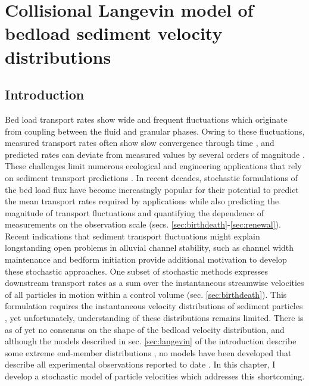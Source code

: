 
\chapter{Collisional Langevin model of bedload sediment velocity distributions}
\label{ch:langevin}
\section{Introduction}

Bed load transport rates show wide and frequent fluctuations which originate from coupling between the fluid and granular phases.
Owing to these fluctuations, measured transport rates often show slow convergence through time \citep{Dhont2018,Turowski2010}, and predicted rates can deviate from measured values by several orders of magnitude \citep{Recking2012,Martin2003}.
These challenges limit numerous ecological and engineering applications that rely on sediment transport predictions \citep{Gaeuman2017,Malmon2005}.
In recent decades, stochastic formulations of the bed load flux have become increasingly popular for their potential to predict the mean transport rates required by applications while also predicting the magnitude of transport fluctuations and quantifying the dependence of measurements on the observation scale (secs. \ref{sec:birthdeath}-\ref{sec:renewal}).
Recent indications that sediment transport fluctuations might explain longstanding open problems in alluvial channel stability, such as channel width maintenance \citep{Abramian2019,Abramian2020} and bedform initiation \citep{Jerolmack2005,Bohorquez2016} provide additional motivation to develop these stochastic approaches.
One subset of stochastic methods expresses downstream transport rates as a sum over the instantaneous streamwise velocities of all particles in motion within a control volume (sec. \ref{sec:birthdeath}).
This formulation requires the instantaneous velocity distributions of sediment particles \citep[e.g.][]{Ancey2020a}, yet unfortunately, understanding of these distributions remains limited.
There is as of yet no consensus on the shape of the bedload velocity distribution, and although the models described in sec. \ref{sec:langevin} of the introduction describe some extreme end-member distributions \citep[e.g.][]{Fan2014,Ancey2014}, no models have been developed that describe all experimental observations reported to date \citep{Lajeunesse2010,Fathel2015,Heyman2016,Liu2019,Houssais2012}.
In this chapter, I develop a stochastic model of particle velocities which addresses this shortcoming.

